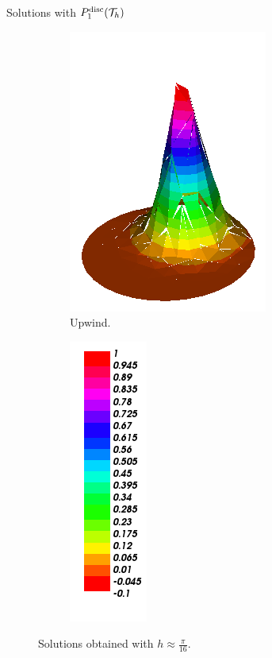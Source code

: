 \begin{frame}{Solutions with $\relax{P}^{\text{disc}}_1(\mathcal{T}_h)$}
\begin{figure}[h!]
\begin{subfigure}[b]{0.27\textwidth}
				\centering
				\includegraphics[scale=0.18]{img/Conveccion_Reaccion/Recortes/steady_convect_react_approx_UPW_n_32.png}
				\caption{Upwind.}
			\end{subfigure}
			\begin{subfigure}[b]{0.15\textwidth}
				\centering
				\includegraphics[scale=0.18]{img/Conveccion_Reaccion/Recortes/steady_convect_react_values.png}
			\end{subfigure}
			\caption{Solutions obtained with $h\approx\frac{\pi}{16}$.}
		\end{figure}
		\begin{figure}[h!]
			\vspace*{-0.5cm}
			\begin{subfigure}[b]{0.27\textwidth}
				\centering

\end{subfigure}
\end{figure}
\end{frame}
